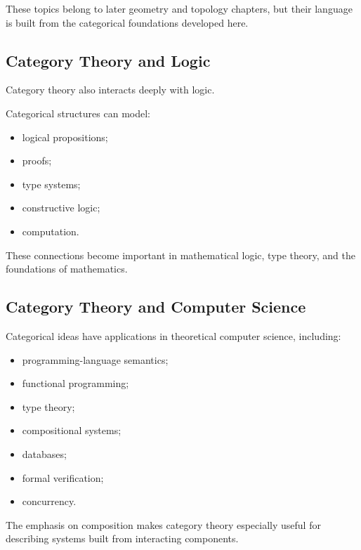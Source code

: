 These topics belong to later geometry and topology chapters, but their
language is built from the categorical foundations developed here.

\subsection{Category Theory and Logic}
\label{subsec:category-logic}

Category theory also interacts deeply with logic.

Categorical structures can model:

\begin{itemize}
    \item logical propositions;
    \item proofs;
    \item type systems;
    \item constructive logic;
    \item computation.
\end{itemize}

These connections become important in mathematical logic, type theory, and
the foundations of mathematics.

\subsection{Category Theory and Computer Science}
\label{subsec:category-computer-science}

Categorical ideas have applications in theoretical computer science,
including:

\begin{itemize}
    \item programming-language semantics;
    \item functional programming;
    \item type theory;
    \item compositional systems;
    \item databases;
    \item formal verification;
    \item concurrency.
\end{itemize}

The emphasis on composition makes category theory especially useful for
describing systems built from interacting components.


